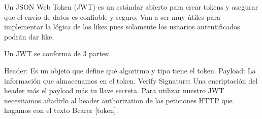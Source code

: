 Un JSON Web Token (JWT) es un estándar abierto para crear tokens y asegurar que el envío de datos es confiable y seguro.
Van a ser muy útiles para implementar la lógica de los likes pues solamente los usuarios autentificados podrán dar like.

Un JWT se conforma de 3 partes:

Header: Es un objeto que define qué algoritmo y tipo tiene el token.
Payload: La información que almacenamos en el token.
Verify Signature: Una encriptación del header más el payload más tu llave secreta.
Para utilizar nuestro JWT necesitamos añadirlo al header authorization de las peticiones HTTP que hagamos con el texto Bearer [token].